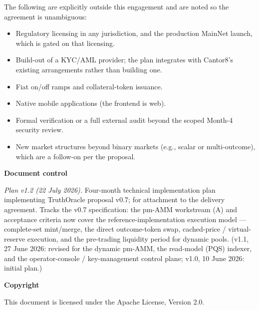 \documentclass[11pt,a4paper]{article}
\begin{document}
The following are explicitly outside this engagement and are noted so the agreement is unambiguous:

\begin{itemize}[leftmargin=2em, itemsep=2pt]
\item Regulatory licensing in any jurisdiction, and the production MainNet launch, which is gated on that licensing.
\item Build-out of a KYC/AML provider; the plan integrates with Cantor8's existing arrangements rather than building one.
\item Fiat on/off ramps and collateral-token issuance.
\item Native mobile applications (the frontend is web).
\item Formal verification or a full external audit beyond the scoped Month-4 security review.
\item New market structures beyond binary markets (e.g., scalar or multi-outcome), which are a follow-on per the proposal.
\end{itemize}

\bigskip
\noindent\textbf{Document control}

\smallskip
\textit{Plan v1.2 (22 July 2026).} Four-month technical implementation plan implementing TruthOracle proposal v0.7; for attachment to the delivery agreement. Tracks the v0.7 specification: the pm-AMM workstream (A) and acceptance criteria now cover the reference-implementation execution model --- complete-set mint/merge, the direct outcome-token swap, cached-price / virtual-reserve execution, and the pre-trading liquidity period for dynamic pools. (v1.1, 27 June 2026: revised for the dynamic pm-AMM, the read-model (PQS) indexer, and the operator-console / key-management control plane; v1.0, 10 June 2026: initial plan.)

\bigskip
\noindent\textbf{Copyright}

This document is licensed under the Apache License, Version 2.0.
\end{document}
